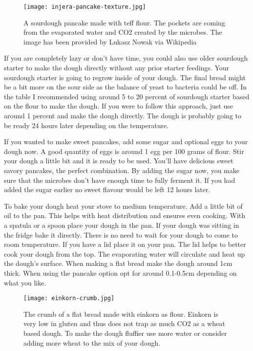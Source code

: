 \begin{figure}[htb!]
  \texttt{[image: injera-pancake-texture.jpg]}
  \centering
  \caption{A sourdough pancake made with teff flour. The pockets are coming from
  the evaporated water and CO2 created by the microbes.
  The image has been provided by Lukasz Nowak via Wikipedia}
\end{figure}

If you are completely lazy or don't have time, you could also use older sourdough starter
to make the dough directly without any prior starter feedings. Your sourdough starter
is going to regrow inside of your dough. The
final bread might be a bit more on the sour side as the balance of yeast to
bacteria could be off. In the table I recommended using around 5 to 20 percent
of sourdough starter based on the flour to make the dough. If you were to follow
this approach, just use around 1 percent and make the dough directly.
The dough is probably going to be ready 24 hours later depending on the temperature.

If you wanted to make sweet pancakes, add some sugar and optional eggs to your dough
now. A good quantity of eggs is around 1 egg per 100 grams of flour.
Stir your dough a little bit and it is ready to be used. You'll 
have delicious sweet savory pancakes, the perfect combination. By
adding the sugar now, you make sure that the microbes don't have
enough time to fully ferment it. If you had added the sugar
earlier no sweet flavour would be left 12 hours later.

To bake your dough heat your stove to medium temperature. Add a little bit of
oil to the pan. This helps with heat distribution and ensures even cooking.
With a spatula or a spoon place your dough in the pan. If your dough
was sitting in the fridge bake it directly. There is no need to wait for your
dough to come to room temperature. If you have a lid
place it on your pan. The lid helps to better cook your dough from the top.
The evaporating water will circulate and heat up the dough's surface. When
making a flat bread make the dough around 1cm thick. When using the pancake
option opt for around 0.1-0.5cm depending on what you like.

\begin{figure}[htb!]
  \texttt{[image: einkorn-crumb.jpg]}
  \centering
  \caption{The crumb of a flat bread made with einkorn as flour. Einkorn
  is very low in gluten and thus does not trap as much CO2 as a wheat based
  dough. To make the dough fluffier use more water or consider adding
  more wheat to the mix of your dough.}
\end{figure}

